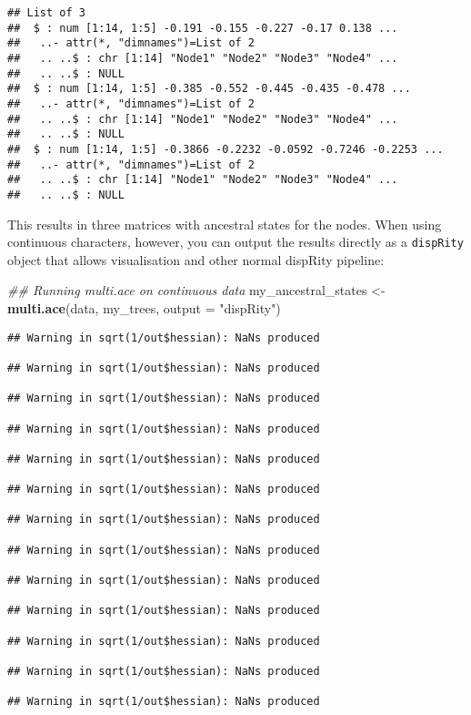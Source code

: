 \documentclass[
]{book}
\newenvironment{Shaded}{\begin{snugshade}}{\end{snugshade}}
\newcommand{\CommentTok}[1]{\textcolor[rgb]{0.56,0.35,0.01}{\textit{#1}}}
\newcommand{\DataTypeTok}[1]{\textcolor[rgb]{0.13,0.29,0.53}{#1}}
\newcommand{\KeywordTok}[1]{\textcolor[rgb]{0.13,0.29,0.53}{\textbf{#1}}}
\newcommand{\NormalTok}[1]{#1}
\newcommand{\StringTok}[1]{\textcolor[rgb]{0.31,0.60,0.02}{#1}}
\begin{document}
\begin{verbatim}
## List of 3
##  $ : num [1:14, 1:5] -0.191 -0.155 -0.227 -0.17 0.138 ...
##   ..- attr(*, "dimnames")=List of 2
##   .. ..$ : chr [1:14] "Node1" "Node2" "Node3" "Node4" ...
##   .. ..$ : NULL
##  $ : num [1:14, 1:5] -0.385 -0.552 -0.445 -0.435 -0.478 ...
##   ..- attr(*, "dimnames")=List of 2
##   .. ..$ : chr [1:14] "Node1" "Node2" "Node3" "Node4" ...
##   .. ..$ : NULL
##  $ : num [1:14, 1:5] -0.3866 -0.2232 -0.0592 -0.7246 -0.2253 ...
##   ..- attr(*, "dimnames")=List of 2
##   .. ..$ : chr [1:14] "Node1" "Node2" "Node3" "Node4" ...
##   .. ..$ : NULL
\end{verbatim}

This results in three matrices with ancestral states for the nodes.
When using continuous characters, however, you can output the results directly as a \texttt{dispRity} object that allows visualisation and other normal dispRity pipeline:

\begin{Shaded}
\begin{Highlighting}[]
\CommentTok{\#\# Running multi.ace on continuous data}
\NormalTok{my\_ancestral\_states \textless{}{-}}\StringTok{ }\KeywordTok{multi.ace}\NormalTok{(data, my\_trees, }\DataTypeTok{output =} \StringTok{"dispRity"}\NormalTok{)}
\end{Highlighting}
\end{Shaded}

\begin{verbatim}
## Warning in sqrt(1/out$hessian): NaNs produced

## Warning in sqrt(1/out$hessian): NaNs produced

## Warning in sqrt(1/out$hessian): NaNs produced

## Warning in sqrt(1/out$hessian): NaNs produced

## Warning in sqrt(1/out$hessian): NaNs produced

## Warning in sqrt(1/out$hessian): NaNs produced

## Warning in sqrt(1/out$hessian): NaNs produced

## Warning in sqrt(1/out$hessian): NaNs produced

## Warning in sqrt(1/out$hessian): NaNs produced

## Warning in sqrt(1/out$hessian): NaNs produced

## Warning in sqrt(1/out$hessian): NaNs produced

## Warning in sqrt(1/out$hessian): NaNs produced

## Warning in sqrt(1/out$hessian): NaNs produced
\end{verbatim}
\end{document}
